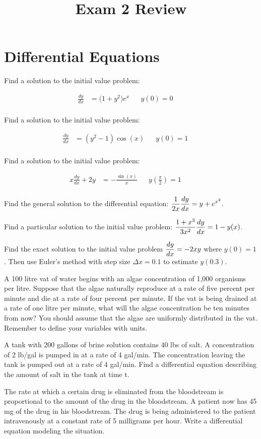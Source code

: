 \documentclass[paper=letter, 11pt]{article}
\title{Exam 2 Review}
\subtitle{}
\newcommand{\IVProb}[1]{
	\begin{minipage}{0.5\textwidth}
		\Prob Find a solution to the initial value problem:
	\end{minipage}%
	\begin{minipage}{0.5\textwidth}
		\begin{align*}
			#1
		\end{align*}
	\end{minipage}
}
\begin{document}
\maketitle

\section*{Differential Equations}

\IVProb{
	\frac{dy}{dx} &= \Big(1 + y^2\Big)e^x && y(0) = 0 && \\
}\vfill

\IVProb{
	\frac{dy}{dx} &=  \left(y^2 - 1\right)\cos(x) && y(0) = 1 && \\
}\vfill


\IVProb{
	x\frac{dy}{dx} + 2y &= -\frac{\sin(x)}{x}  && y\left(\frac{\pi}{2}\right) = 1 && \\
}\vfill

\newpage

\Prob Find the general solution to the differential equation: \quad $\displaystyle \frac{1}{2x}\frac{dy}{dx} = y + e^{x^2}$.\vfill

\Prob Find a particular solution to the initial value problem: \quad $\displaystyle \frac{1 + x^3}{3x^2}\frac{dy}{dx} = 1 - y(x)$.\vfill

\Prob Find the exact solution to the initial value problem $\displaystyle\frac{dy}{dx} = -2xy$ where $y(0) = 1$.  Then use Euler's method with step size $\Delta x = 0.1$ to estimate $y(0.3)$.\vfill

\newpage

\Prob A 100 litre vat of water begins with an algae concentration of 1,000 organisms per litre.
Suppose that the algae naturally reproduce at a rate of five percent per minute and die
at a rate of four percent per minute. If the vat is being drained at a rate of one litre
per minute, what will the algae concentration be ten minutes from now? You should
assume that the algae are uniformly distributed in the vat. Remember to define your variables with units.\vfill

\Prob A tank with 200 gallons of brine solution contains 40 lbs of salt. A concentration of
2 lb/gal is pumped in at a rate of 4 gal/min. The concentration leaving the tank is
pumped out at a rate of 4 gal/min. Find a differential equation describing the amount
of salt in the tank at time t.\vfill

\Prob The rate at which a certain drug is eliminated from the bloodstream is proportional to
the amount of the drug in the bloodstream. A patient now has 45 mg of the drug in his
bloodstream. The drug is being administered to the patient intravenously at a constant
rate of 5 milligrams per hour. Write a differential equation modeling the situation.\vfill
\end{document}
